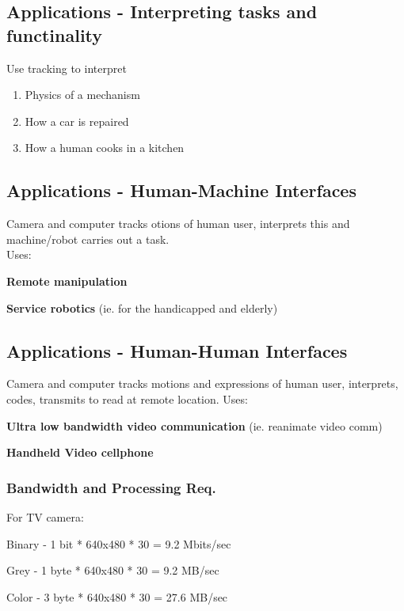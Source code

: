 \documentclass{article}
\begin{document}
\subsection{Applications - Interpreting tasks and functinality}
Use tracking to interpret
\begin{enumerate}
    \item Physics of a mechanism
    \item How a car is repaired
    \item How a human cooks in a kitchen
\end{enumerate}

\subsection{Applications - Human-Machine Interfaces}
Camera and computer tracks otions of human user, interprets this and machine/robot carries out a task.\\
Uses:
\begin{list}{}{}
    \item \textbf{Remote manipulation}
    \item \textbf{Service robotics} (ie. for the handicapped and elderly)
\end{list}

\subsection{Applications - Human-Human Interfaces}
Camera and computer tracks motions and expressions of human user, interprets, codes, 
transmits to read at remote location.
Uses:
\begin{list}{}{}
    \item \textbf{Ultra low bandwidth video communication} (ie. reanimate video comm)
    \item \textbf{Handheld Video cellphone}
\end{list}


\subsubsection{Bandwidth and Processing Req.}
For TV camera:
\begin{list}{}{}
    \item Binary - 1 bit * 640x480 * 30 = 9.2 Mbits/sec
    \item Grey - 1 byte * 640x480 * 30 = 9.2 MB/sec
    \item Color - 3 byte * 640x480 * 30 = 27.6 MB/sec
\end{list}
\end{document}
